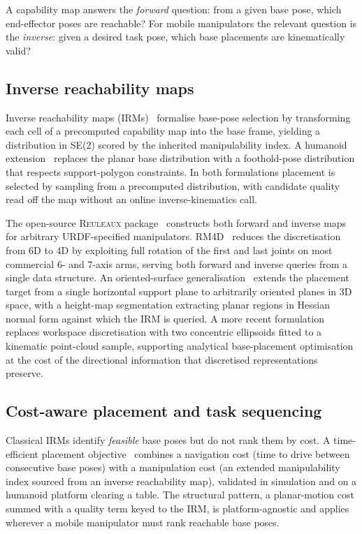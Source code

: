 \documentclass[11pt,a4paper]{article}
\begin{document}
A capability map answers the \emph{forward} question: from a given base pose, which end-effector poses are reachable? For mobile manipulators the relevant question is the \emph{inverse}: given a desired task pose, which base placements are kinematically valid?

\subsection{Inverse reachability maps}

Inverse reachability maps (IRMs)~\parencite{RobotPlacementBased} formalise base-pose selection by transforming each cell of a precomputed capability map into the base frame, yielding a distribution in SE(2) scored by the inherited manipulability index. A humanoid extension~\parencite{burget2015stance} replaces the planar base distribution with a foothold-pose distribution that respects support-polygon constraints. In both formulations placement is selected by sampling from a precomputed distribution, with candidate quality read off the map without an online inverse-kinematics call.

The open-source \textsc{Reuleaux} package~\parencite{makhalReuleauxRobotBase2017} constructs both forward and inverse maps for arbitrary URDF-specified manipulators. RM4D~\parencite{rudorferRM4DCombinedReachability2024} reduces the discretisation from 6D to 4D by exploiting full rotation of the first and last joints on most commercial 6- and 7-axis arms, serving both forward and inverse queries from a single data structure. An oriented-surface generalisation~\parencite{birrOrientedSurfaceReachability2022} extends the placement target from a single horizontal support plane to arbitrarily oriented planes in 3D space, with a height-map segmentation extracting planar regions in Hessian normal form against which the IRM is queried. A more recent formulation~\parencite{cavelliMobileManipulatorBase2025} replaces workspace discretisation with two concentric ellipsoids fitted to a kinematic point-cloud sample, supporting analytical base-placement optimisation at the cost of the directional information that discretised representations preserve.

\subsection{Cost-aware placement and task sequencing}

Classical IRMs identify \emph{feasible} base poses but do not rank them by cost. A time-efficient placement objective~\parencite{reisterCombiningNavigationManipulation2022} combines a navigation cost (time to drive between consecutive base poses) with a manipulation cost (an extended manipulability index sourced from an inverse reachability map), validated in simulation and on a humanoid platform clearing a table. The structural pattern, a planar-motion cost summed with a quality term keyed to the IRM, is platform-agnostic and applies wherever a mobile manipulator must rank reachable base poses.
\end{document}
